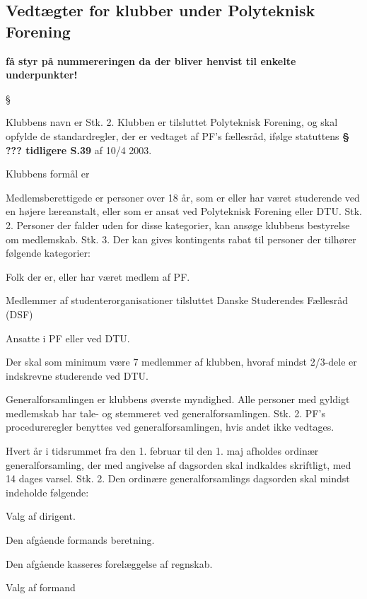 \subsection{Vedtægter for klubber under Polyteknisk Forening}
\textbf{få styr på nummereringen da der bliver henvist til enkelte underpunkter!}
\begin{list}
{\S {}}{}
\item Klubbens navn er %
Stk. 2. Klubben er tilsluttet Polyteknisk Forening, og skal opfylde de standardregler, der er vedtaget af PF's
fællesråd, ifølge statuttens \textbf{§ ??? tidligere S.39 }af 10/4 2003.
\item Klubbens formål er %
\item Medlemsberettigede er personer over 18 år, som er eller har været studerende ved en højere læreanstalt, eller
som er ansat ved Polyteknisk Forening eller DTU.
Stk. 2. Personer der falder uden for disse kategorier, kan ansøge klubbens bestyrelse om medlemskab.
Stk. 3. Der kan gives kontingents rabat til personer der tilhører følgende kategorier:
\begin{list}{•}
\item  Folk der er, eller har været medlem af PF.
\item  Medlemmer af studenterorganisationer tilsluttet Danske Studerendes Fællesråd (DSF)
\item  Ansatte i PF eller ved DTU.
\end{list}
\item Der skal som minimum være 7 medlemmer af klubben, hvoraf mindst 2/3-dele er indskrevne
studerende ved DTU.
\item Generalforsamlingen er klubbens øverste myndighed. Alle personer med gyldigt medlemskab har tale- og
stemmeret ved generalforsamlingen.
Stk. 2. PF's procedureregler benyttes ved generalforsamlingen, hvis andet ikke vedtages.
\item Hvert år i tidsrummet fra den 1. februar til den 1. maj afholdes ordinær generalforsamling, der med angivelse
af dagsorden skal indkaldes skriftligt, med 14 dages varsel.
Stk. 2. Den ordinære generalforsamlings dagsorden skal mindst indeholde følgende:
\begin{list}{•}
\item Valg af dirigent.
\item Den afgående formands beretning.
\item Den afgående kasseres forelæggelse af regnskab.
\item Valg af formand

\end{list}
\end{list}
